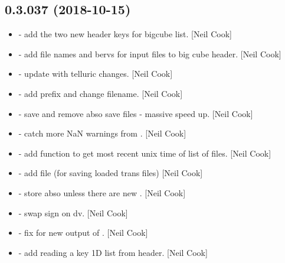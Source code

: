 \documentclass[a4paper,10pt,english]{report}
\begin{document}
\subsection{0.3.037 (2018-10-15)}
\label{\detokenize{misc/changelog:id295}}\begin{itemize}
\item {} 
 - add the two new header keys for bigcube list.
{[}Neil Cook{]}

\item {} 
 - add file names and bervs for input files to
big cube header. {[}Neil Cook{]}

\item {} 
 - update with telluric changes. {[}Neil Cook{]}

\item {} 
 - add prefix and change filename. {[}Neil Cook{]}

\item {} 
 - save and remove abso save files - massive speed up.
{[}Neil Cook{]}

\item {} 
 - catch more NaN warnings from . {[}Neil
Cook{]}

\item {} 
 - add  function to get most recent unix
time of list of files. {[}Neil Cook{]}

\item {} 
 - add  file (for saving loaded trans
files) {[}Neil Cook{]}

\item {} 
 - store abso unless there are new . {[}Neil
Cook{]}

\item {} 
 - swap sign on dv. {[}Neil Cook{]}

\item {} 
 - fix for new output of . {[}Neil Cook{]}

\item {} 
 - add reading a key 1D list from header. {[}Neil Cook{]}


\end{itemize}
\end{document}
